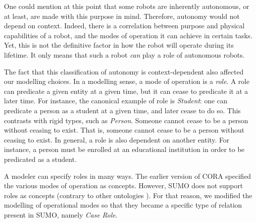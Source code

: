 \documentclass[preprint,12pt]{elsarticle}
\newcommand{\hlc}[2][yellow]{ {\sethlcolor{#1} \hl{#2}} }
\newcommand{\joel}[1]{{\hlc[green]{\textbf{Joel}: #1}}}
\begin{document}

One could mention at this point that some robots are inherently autonomous, or at least, are made with this purpose in mind. Therefore, autonomy would not depend on context. Indeed, there is a correlation between purpose and physical capabilities of a robot, and the modes of operation it can achieve in certain tasks. Yet, this is not the definitive factor in how the robot will operate during its lifetime. It only means that such a robot \emph{can} play a role of autonomous robots.

The fact that this classification of autonomy is context-dependent also affected our modelling choices. In a modelling sense, a mode of operation is a \emph{role}. A role can predicate a given entity at a given time, but it can cease to predicate it at a later time. For instance, the canonical example of role is \emph{Student}: one can predicate a person as a student at a given time, and later cease to do so. This contrasts with rigid types, such as \emph{Person}. Someone cannot cease to be a person without ceasing to exist. That is, someone cannot cease to be a person without ceasing to exist. In general, a role is also dependent on another entity. For instance, a person must be enrolled at an educational institution in order to be predicated as a student.

A modeler can specify roles in many ways. The earlier version of CORA specified the various modes of operation as concepts. However, SUMO does not support roles as concepts (contrary to other ontologies \cite{Guizzardi2005}). For that reason, we modified the modelling of operational modes so that they became a specific type of relation present in SUMO, namely \emph{Case Role}.
\end{document}
